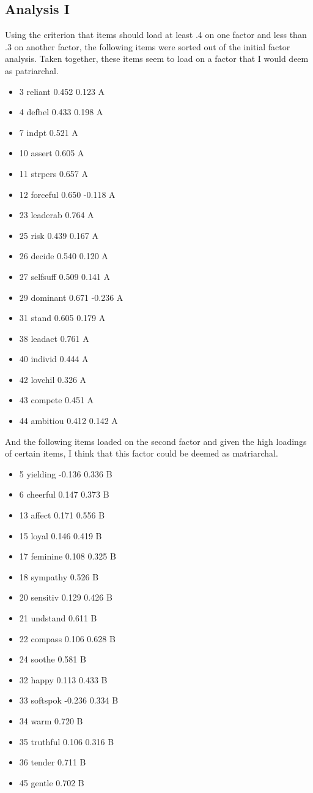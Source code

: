 \documentclass[]{book}
\providecommand{\tightlist}{%
  \setlength{\itemsep}{0pt}\setlength{\parskip}{0pt}}
\theoremstyle{definition}
\theoremstyle{definition}
\theoremstyle{definition}
\theoremstyle{remark}
\begin{document}
\subsection{Analysis I}\label{analysis-i-1}

Using the criterion that items should load at least .4 on one factor and
less than .3 on another factor, the following items were sorted out of
the initial factor analysis. Taken together, these items seem to load on
a factor that I would deem as patriarchal.

\begin{itemize}
\tightlist
\item
  3 reliant 0.452 0.123 A
\item
  4 defbel 0.433 0.198 A
\item
  7 indpt 0.521 A
\item
  10 assert 0.605 A
\item
  11 strpers 0.657 A
\item
  12 forceful 0.650 -0.118 A
\item
  23 leaderab 0.764 A
\item
  25 risk 0.439 0.167 A
\item
  26 decide 0.540 0.120 A
\item
  27 selfsuff 0.509 0.141 A
\item
  29 dominant 0.671 -0.236 A
\item
  31 stand 0.605 0.179 A
\item
  38 leadact 0.761 A
\item
  40 individ 0.444 A
\item
  42 lovchil 0.326 A
\item
  43 compete 0.451 A
\item
  44 ambitiou 0.412 0.142 A
\end{itemize}

And the following items loaded on the second factor and given the high
loadings of certain items, I think that this factor could be deemed as
matriarchal.

\begin{itemize}
\tightlist
\item
  5 yielding -0.136 0.336 B
\item
  6 cheerful 0.147 0.373 B
\item
  13 affect 0.171 0.556 B
\item
  15 loyal 0.146 0.419 B
\item
  17 feminine 0.108 0.325 B
\item
  18 sympathy 0.526 B
\item
  20 sensitiv 0.129 0.426 B
\item
  21 undstand 0.611 B
\item
  22 compass 0.106 0.628 B
\item
  24 soothe 0.581 B
\item
  32 happy 0.113 0.433 B
\item
  33 softspok -0.236 0.334 B
\item
  34 warm 0.720 B
\item
  35 truthful 0.106 0.316 B
\item
  36 tender 0.711 B
\item
  45 gentle 0.702 B
\end{itemize}
\end{document}
